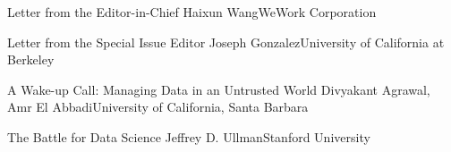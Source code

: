 \documentclass[11pt]{article}
\begin{document}


\begin{bulletin}


%
%

\begin{lettersection}


\begin{letter}{Letter from the Editor-in-Chief}
{Haixun Wang}{WeWork Corporation}

\end{letter}
%
\newpage
%
%
\begin{letter}{Letter from the Special Issue Editor}
{Joseph Gonzalez}{University of California at Berkeley}


\end{letter}

\end{lettersection}



\begin{opinionsection}
\begin{opinion}{A Wake-up Call: Managing Data in an Untrusted World}
{Divyakant Agrawal, Amr El Abbadi}{University of California, Santa Barbara}

\end{opinion}
\begin{opinion}{The Battle for Data Science}
{Jeffrey D. Ullman}{Stanford University}

\end{opinion}
\end{opinionsection}


\end{bulletin}
\end{document}
